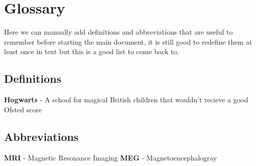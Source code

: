 \documentclass[../main.tex]{subfiles}
\begin{document}


\section*{Glossary}
Here we can manually add definitions and abbreviations that are useful to remember before starting the main document, it is still good to redefine them at least once in text but this is a good list to come back to.

\subsection*{Definitions}
\textbf{Hogwarts} - A school for magical British children that wouldn't recieve a good Ofsted score

\subsection*{Abbreviations}
\textbf{MRI} - Magnetic Resonance Imaging
\textbf{MEG} - Magnetoencephalogray 
\end{document}

